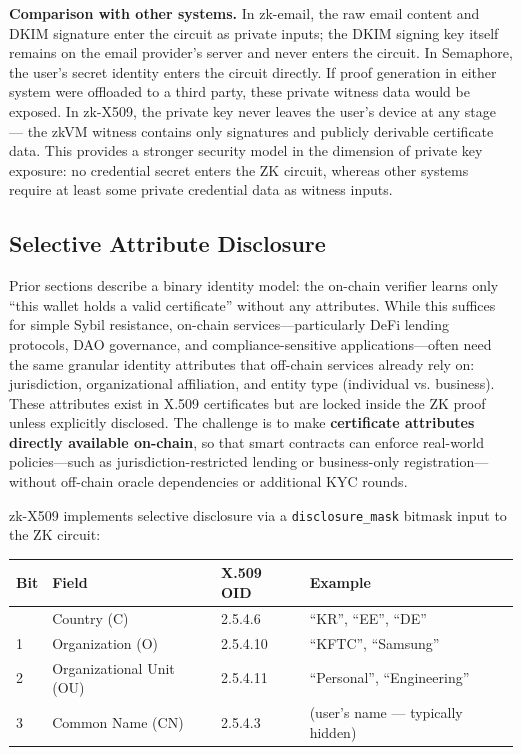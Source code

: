\documentclass[11pt, a4paper]{article}
\begin{document}
\textbf{Comparison with other systems.} In zk-email, the raw email
content and DKIM signature enter the circuit as private inputs; the DKIM
signing key itself remains on the email provider's server and never
enters the circuit. In Semaphore, the user's secret identity enters the
circuit directly. If proof generation in either system were offloaded to
a third party, these private witness data would be exposed. In zk-X509,
the private key never leaves the user's device at any stage --- the zkVM
witness contains only signatures and publicly derivable certificate
data. This provides a stronger security model in the dimension of
private key exposure: no credential secret enters the ZK circuit,
whereas other systems require at least some private credential data as
witness inputs.

\subsection{Selective Attribute
Disclosure}\label{selective-attribute-disclosure}

Prior sections describe a binary identity model: the on-chain verifier
learns only ``this wallet holds a valid certificate'' without any
attributes. While this suffices for simple Sybil resistance,
on-chain services---particularly DeFi lending protocols, DAO governance,
and compliance-sensitive applications---often need the same granular
identity attributes that off-chain services already rely on:
jurisdiction, organizational affiliation, and entity type (individual vs.
business). These attributes exist in X.509 certificates but are locked
inside the ZK proof unless explicitly disclosed.
The challenge is to make \textbf{certificate attributes directly
available on-chain}, so that smart contracts can enforce real-world
policies---such as jurisdiction-restricted lending or business-only
registration---without off-chain oracle dependencies or additional KYC
rounds.

zk-X509 implements selective disclosure via a \texttt{disclosure\_mask}
bitmask input to the ZK circuit:

\begin{longtable}[]{@{}llll@{}}
\toprule\noalign{}
Bit & Field & X.509 OID & Example \\
\midrule\noalign{}
\endhead
\bottomrule\noalign{}
\endlastfoot
0 & Country (C) & 2.5.4.6 & ``KR'', ``EE'', ``DE'' \\
1 & Organization (O) & 2.5.4.10 & ``KFTC'', ``Samsung'' \\
2 & Organizational Unit (OU) & 2.5.4.11 & ``Personal'', ``Engineering'' \\
3 & Common Name (CN) & 2.5.4.3 & (user's name --- typically hidden) \\
\end{longtable}
\end{document}
